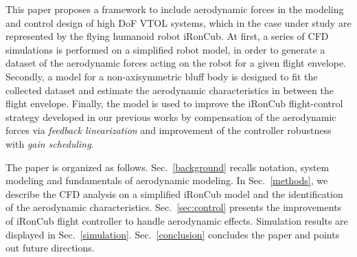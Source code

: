 This paper proposes a framework to include aerodynamic forces in the modeling and control design of high DoF VTOL systems, which in the case under study are represented by the flying humanoid robot iRonCub. At first, a series of CFD simulations is performed on a simplified robot model, in order to generate a dataset of the aerodynamic forces acting on the robot for a given flight envelope. Secondly, a model for a non-axisymmetric bluff body is designed to fit the collected dataset and estimate the aerodynamic characteristics in between the flight envelope. Finally, the model is used to improve the iRonCub flight-control strategy developed in our previous works \cite{pucci2017momentum}\cite{nava2018position} by compensation of the aerodynamic forces via \emph{feedback linearization} and improvement of the controller robustness with \emph{gain scheduling}.

The paper is organized as follows. Sec.~\ref{background} recalls notation, system modeling and fundamentals of aerodynamic modeling. In Sec.~\ref{methods}, we describe the CFD analysis on a simplified iRonCub model and the identification of the aerodynamic characteristics. Sec.~\ref{sec:control} presents the improvements of iRonCub flight controller to handle aerodynamic effects. Simulation results are displayed in Sec.~\ref{simulation}. Sec.~\ref{conclusion} concludes the paper and points out future directions.

